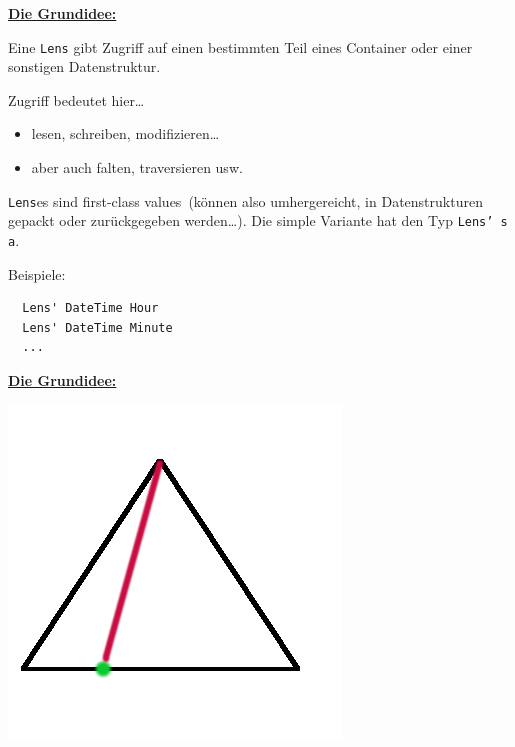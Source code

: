 \documentclass{beamer}
\begin{document}
\begin{frame}[fragile]

\Large \textbf{\underline{Die Grundidee:}}\normalsize
\bigskip

Eine \texttt{Lens} gibt Zugriff auf einen bestimmten Teil eines Container oder einer sonstigen Datenstruktur.\pause\smallskip

Zugriff bedeutet hier\dots
\begin{itemize}
\item lesen, schreiben, modifizieren\dots\pause
\item aber auch falten, traversieren usw.\pause
\end{itemize}
\smallskip

\texttt{Lens}es sind \glqq first-class values\grqq\ (können also umhergereicht, in Datenstrukturen gepackt oder zurückgegeben werden\dots). Die simple Variante hat den Typ \texttt{Lens' s a}.
\pause
\bigskip

Beispiele:
\begin{verbatim}
  Lens' DateTime Hour
  Lens' DateTime Minute
  ...
\end{verbatim}
\end{frame}


\begin{frame}

\Large \textbf{\underline{Die Grundidee:}}\normalsize

\begin{center}
\includegraphics[scale=0.5]{lens_0.png} 
\end{center}

\end{frame}
\end{document}
